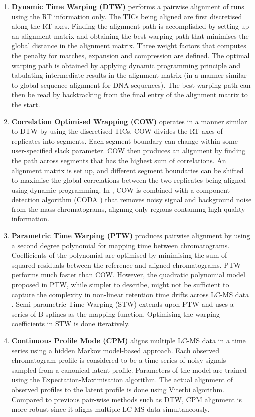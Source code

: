 \begin{enumerate}
\item \textbf{Dynamic Time Warping (DTW)} \cite{Sakoe1978} performs a pairwise alignment of runs using the RT information only. The TICs being aligned are first discretised along the RT axes. Finding the alignment path is accomplished by setting up an alignment matrix and obtaining the best warping path that minimises the global distance in the alignment matrix. Three weight factors that computes the penalty for matches, expansion and compression are defined. The optimal warping path is obtained by applying dynamic programming principle and tabulating intermediate results in the alignment matrix (in a manner similar to global sequence alignment for DNA sequences). The best warping path can then be read by backtracking from the final entry of the alignment matrix to the start. 
\item \textbf{Correlation Optimised Wrapping (COW)} \cite{Nielsen1998} operates in a manner similar to DTW by using the discretised TICs. COW divides the RT axes of replicates into segments. Each segment boundary can change within some user-specified slack parameter. COW then produces an alignment by finding the path across segments that has the highest sum of correlations. An alignment matrix is set up, and different segment boundaries can be shifted to maximise the global correlations between the two replicates being aligned using dynamic programming. In \cite{Christin2008}, COW is combined with a component detection algorithm (CODA \cite{Windig2007}) that removes noisy signal and background noise from the mass chromatograms, aligning only regions containing high-quality information.
\item \textbf{Parametric Time Warping (PTW)} \cite{VanNederkassel2006} produces pairwise alignment by using a second degree polynomial for mapping time between chromatograms. Coefficients of the polynomial are optimised by minimising the sum of squared residuals between the reference and aligned chromatograms. PTW performs much faster than COW. However, the quadratic polynomial model proposed in PTW, while simpler to describe, might not be sufficient to capture the complexity in non-linear retention time drifts across LC-MS data \cite{Podwojski2009}. Semi-parametric Time Warping (STW) extends upon PTW and uses a series of B-splines as the mapping function. Optimising the warping coefficients in STW is done iteratively.
\item \textbf{Continuous Profile Mode (CPM)} \cite{Listgarten2005} aligns multiple LC-MS data in a time series using a hidden Markov model-based approach. Each observed chromatogram profile is considered to be a time series of noisy signals sampled from a canonical latent profile. Parameters of the model are trained using the Expectation-Maximisation algorithm. The actual alignment of observed profiles to the latent profile is done using Viterbi algorithm. Compared to previous pair-wise methods such as DTW, CPM alignment is more robust since it aligns multiple LC-MS data simultaneously. 
\end{enumerate}

